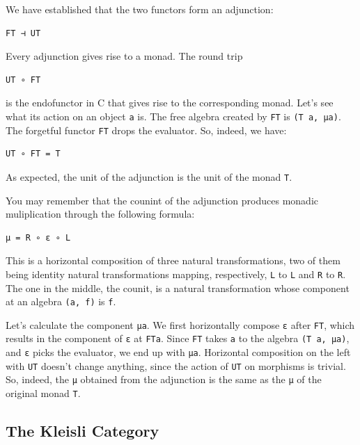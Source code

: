 We have established that the two functors form an adjunction:

\begin{verbatim}
FT ⊣ UT
\end{verbatim}

Every adjunction gives rise to a monad. The round trip

\begin{verbatim}
UT ∘ FT
\end{verbatim}

is the endofunctor in C that gives rise to the corresponding monad.
Let's see what its action on an object \texttt{a} is. The free algebra
created by \texttt{FT} is \texttt{(T\ a,\ μa)}. The forgetful functor
\texttt{FT} drops the evaluator. So, indeed, we have:

\begin{verbatim}
UT ∘ FT = T
\end{verbatim}

As expected, the unit of the adjunction is the unit of the monad
\texttt{T}.

You may remember that the counint of the adjunction produces monadic
muliplication through the following formula:

\begin{verbatim}
μ = R ∘ ε ∘ L
\end{verbatim}

This is a horizontal composition of three natural transformations, two
of them being identity natural transformations mapping, respectively,
\texttt{L} to \texttt{L} and \texttt{R} to \texttt{R}. The one in the
middle, the counit, is a natural transformation whose component at an
algebra \texttt{(a,\ f)} is \texttt{f}.

Let's calculate the component \texttt{μa}. We first horizontally compose
\texttt{ε} after \texttt{FT}, which results in the component of
\texttt{ε} at \texttt{FTa}. Since \texttt{FT} takes \texttt{a} to the
algebra \texttt{(T\ a,\ μa)}, and \texttt{ε} picks the evaluator, we end
up with \texttt{μa}. Horizontal composition on the left with \texttt{UT}
doesn't change anything, since the action of \texttt{UT} on morphisms is
trivial. So, indeed, the \texttt{μ} obtained from the adjunction is the
same as the \texttt{μ} of the original monad \texttt{T}.

\subsection{The Kleisli Category}\label{the-kleisli-category}

